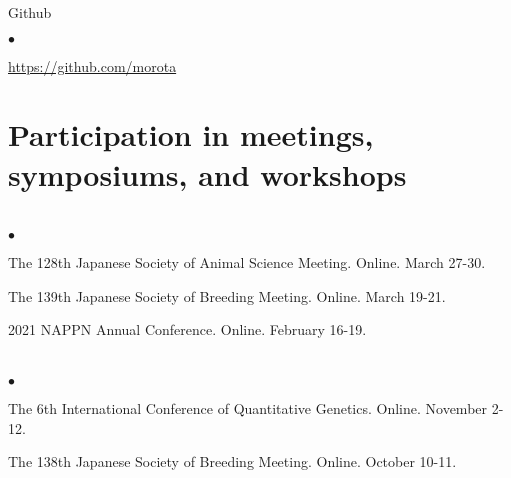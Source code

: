 \documentclass[margin,line,10pt]{res}
\newenvironment{list1}{
  \begin{list}{\ding{113}}{%
      \setlength{\itemsep}{0in}
      \setlength{\parsep}{0in} \setlength{\parskip}{0in}
      \setlength{\topsep}{0in} \setlength{\partopsep}{0in} 
      \setlength{\leftmargin}{0.17in}}}{\end{list}}
\newenvironment{list2}{
  \begin{list}{$\bullet$}{%
      \setlength{\itemsep}{0in}
      \setlength{\parsep}{0in} \setlength{\parskip}{0in}
      \setlength{\topsep}{0in} \setlength{\partopsep}{0in} 
      \setlength{\leftmargin}{0.2in}}}{\end{list}}
\begin{document}
\begin{resume}
\begin{list1}
\vspace{0.3cm}
\item[] Github
\begin{list2}
\item \textcolor{blue}{\href{https://github.com/morota}{https://github.com/morota}} 
\end{list2}
\end{list1}









\vspace{0.5cm}
\section{\sc Participation in meetings, symposiums, and workshops} 
\vspace{2cm}


\section{}
\begin{list2}
  
\item  The 128th Japanese Society of Animal Science Meeting. Online. March 27-30.
  
  \vspace{0.5cm}
  
\item The 139th Japanese Society of Breeding Meeting. Online. March 19-21.  

    \vspace{0.5cm}

  \item 2021 NAPPN Annual Conference. Online. February 16-19.  
  
\end{list2}

  
\section{}
\begin{list2}


\item  The 6th International Conference of Quantitative Genetics. Online. November 2-12. 

  \vspace{0.5cm}

  
  \item The 138th Japanese Society of Breeding Meeting. Online. October 10-11.  


\end{list2}
\end{resume}
\end{document}
